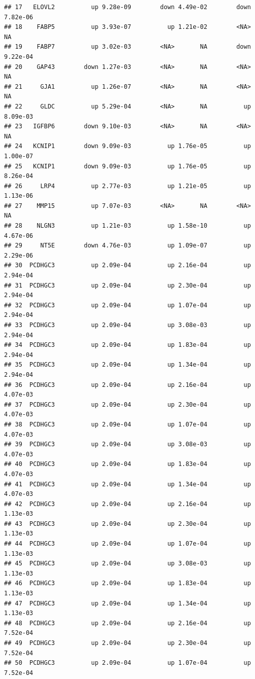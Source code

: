 \documentclass{article}\usepackage[]{graphicx}\usepackage[]{color}
\makeatletter
\newenvironment{kframe}{%
 \def\at@end@of@kframe{}%
 \ifinner\ifhmode%
  \def\at@end@of@kframe{\end{minipage}}%
  \begin{minipage}{\columnwidth}%
 \fi\fi%
 \def\FrameCommand##1{\hskip\@totalleftmargin \hskip-\fboxsep
 \colorbox{shadecolor}{##1}\hskip-\fboxsep
     \hskip-\linewidth \hskip-\@totalleftmargin \hskip\columnwidth}%
 \MakeFramed {\advance\hsize-\width
   \@totalleftmargin\z@ \linewidth\hsize
   \@setminipage}}%
 {\par\unskip\endMakeFramed%
 \at@end@of@kframe}
\newenvironment{knitrout}{}{} %
\makeatother
\begin{document}
\begin{knitrout}
\begin{kframe}
\begin{verbatim}
## 17   ELOVL2          up 9.28e-09        down 4.49e-02        down 7.82e-06
## 18    FABP5          up 3.93e-07          up 1.21e-02        <NA>       NA
## 19    FABP7          up 3.02e-03        <NA>       NA        down 9.22e-04
## 20    GAP43        down 1.27e-03        <NA>       NA        <NA>       NA
## 21     GJA1          up 1.26e-07        <NA>       NA        <NA>       NA
## 22     GLDC          up 5.29e-04        <NA>       NA          up 8.09e-03
## 23   IGFBP6        down 9.10e-03        <NA>       NA        <NA>       NA
## 24   KCNIP1        down 9.09e-03          up 1.76e-05          up 1.00e-07
## 25   KCNIP1        down 9.09e-03          up 1.76e-05          up 8.26e-04
## 26     LRP4          up 2.77e-03          up 1.21e-05          up 1.13e-06
## 27    MMP15          up 7.07e-03        <NA>       NA        <NA>       NA
## 28    NLGN3          up 1.21e-03          up 1.58e-10          up 4.67e-06
## 29     NT5E        down 4.76e-03          up 1.09e-07          up 2.29e-06
## 30  PCDHGC3          up 2.09e-04          up 2.16e-04          up 2.94e-04
## 31  PCDHGC3          up 2.09e-04          up 2.30e-04          up 2.94e-04
## 32  PCDHGC3          up 2.09e-04          up 1.07e-04          up 2.94e-04
## 33  PCDHGC3          up 2.09e-04          up 3.08e-03          up 2.94e-04
## 34  PCDHGC3          up 2.09e-04          up 1.83e-04          up 2.94e-04
## 35  PCDHGC3          up 2.09e-04          up 1.34e-04          up 2.94e-04
## 36  PCDHGC3          up 2.09e-04          up 2.16e-04          up 4.07e-03
## 37  PCDHGC3          up 2.09e-04          up 2.30e-04          up 4.07e-03
## 38  PCDHGC3          up 2.09e-04          up 1.07e-04          up 4.07e-03
## 39  PCDHGC3          up 2.09e-04          up 3.08e-03          up 4.07e-03
## 40  PCDHGC3          up 2.09e-04          up 1.83e-04          up 4.07e-03
## 41  PCDHGC3          up 2.09e-04          up 1.34e-04          up 4.07e-03
## 42  PCDHGC3          up 2.09e-04          up 2.16e-04          up 1.13e-03
## 43  PCDHGC3          up 2.09e-04          up 2.30e-04          up 1.13e-03
## 44  PCDHGC3          up 2.09e-04          up 1.07e-04          up 1.13e-03
## 45  PCDHGC3          up 2.09e-04          up 3.08e-03          up 1.13e-03
## 46  PCDHGC3          up 2.09e-04          up 1.83e-04          up 1.13e-03
## 47  PCDHGC3          up 2.09e-04          up 1.34e-04          up 1.13e-03
## 48  PCDHGC3          up 2.09e-04          up 2.16e-04          up 7.52e-04
## 49  PCDHGC3          up 2.09e-04          up 2.30e-04          up 7.52e-04
## 50  PCDHGC3          up 2.09e-04          up 1.07e-04          up 7.52e-04

\end{verbatim}
\end{kframe}
\end{knitrout}
\end{document}
